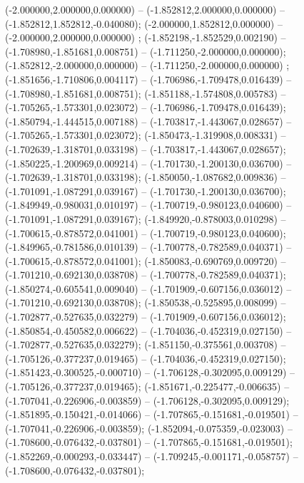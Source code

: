  (-2.000000,2.000000,0.000000) -- (-1.852812,2.000000,0.000000) -- (-1.852812,1.852812,-0.040080);
 (-2.000000,1.852812,0.000000) -- (-2.000000,2.000000,0.000000) ;
 (-1.852198,-1.852529,0.002190) -- (-1.708980,-1.851681,0.008751) -- (-1.711250,-2.000000,0.000000);
 (-1.852812,-2.000000,0.000000) -- (-1.711250,-2.000000,0.000000) ;
 (-1.851656,-1.710806,0.004117) -- (-1.706986,-1.709478,0.016439) -- (-1.708980,-1.851681,0.008751);
 (-1.851188,-1.574808,0.005783) -- (-1.705265,-1.573301,0.023072) -- (-1.706986,-1.709478,0.016439);
 (-1.850794,-1.444515,0.007188) -- (-1.703817,-1.443067,0.028657) -- (-1.705265,-1.573301,0.023072);
 (-1.850473,-1.319908,0.008331) -- (-1.702639,-1.318701,0.033198) -- (-1.703817,-1.443067,0.028657);
 (-1.850225,-1.200969,0.009214) -- (-1.701730,-1.200130,0.036700) -- (-1.702639,-1.318701,0.033198);
 (-1.850050,-1.087682,0.009836) -- (-1.701091,-1.087291,0.039167) -- (-1.701730,-1.200130,0.036700);
 (-1.849949,-0.980031,0.010197) -- (-1.700719,-0.980123,0.040600) -- (-1.701091,-1.087291,0.039167);
 (-1.849920,-0.878003,0.010298) -- (-1.700615,-0.878572,0.041001) -- (-1.700719,-0.980123,0.040600);
 (-1.849965,-0.781586,0.010139) -- (-1.700778,-0.782589,0.040371) -- (-1.700615,-0.878572,0.041001);
 (-1.850083,-0.690769,0.009720) -- (-1.701210,-0.692130,0.038708) -- (-1.700778,-0.782589,0.040371);
 (-1.850274,-0.605541,0.009040) -- (-1.701909,-0.607156,0.036012) -- (-1.701210,-0.692130,0.038708);
 (-1.850538,-0.525895,0.008099) -- (-1.702877,-0.527635,0.032279) -- (-1.701909,-0.607156,0.036012);
 (-1.850854,-0.450582,0.006622) -- (-1.704036,-0.452319,0.027150) -- (-1.702877,-0.527635,0.032279);
 (-1.851150,-0.375561,0.003708) -- (-1.705126,-0.377237,0.019465) -- (-1.704036,-0.452319,0.027150);
 (-1.851423,-0.300525,-0.000710) -- (-1.706128,-0.302095,0.009129) -- (-1.705126,-0.377237,0.019465);
 (-1.851671,-0.225477,-0.006635) -- (-1.707041,-0.226906,-0.003859) -- (-1.706128,-0.302095,0.009129);
 (-1.851895,-0.150421,-0.014066) -- (-1.707865,-0.151681,-0.019501) -- (-1.707041,-0.226906,-0.003859);
 (-1.852094,-0.075359,-0.023003) -- (-1.708600,-0.076432,-0.037801) -- (-1.707865,-0.151681,-0.019501);
 (-1.852269,-0.000293,-0.033447) -- (-1.709245,-0.001171,-0.058757) -- (-1.708600,-0.076432,-0.037801);
